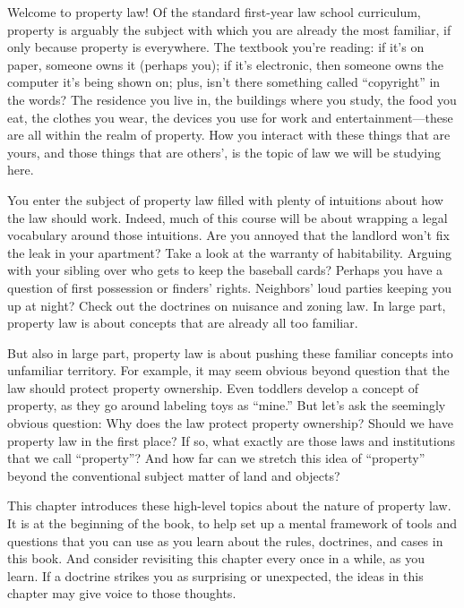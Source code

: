 Welcome to property law! Of the standard first-year law school curriculum,
property is arguably the subject with which you are already the most familiar,
if only because property is everywhere. The textbook you're reading: if it's on
paper, someone owns it (perhaps you); if it's electronic, then someone owns the
computer it's being shown on; plus, isn't there something called ``copyright''
in the words? The residence you live in, the buildings where you study,
the food you eat, the clothes you wear, the devices you use for work and
entertainment---these are all within the realm of property. How you interact
with these things that are yours, and those things that are others', is the
topic of law we will be studying here.

You enter the subject of property law filled with plenty of intuitions about how
the law should work. Indeed, much of this course will be about wrapping a legal
vocabulary around those intuitions. Are you annoyed that the landlord won't fix
the leak in your apartment? Take a look at the warranty of habitability. Arguing
with your sibling over who gets to keep the baseball cards? Perhaps you have a
question of first possession or finders' rights. Neighbors' loud parties keeping
you up at night? Check out the doctrines on nuisance and zoning law. In large
part, property law is about concepts that are already all too familiar.

But also in large part, property law is about pushing these familiar concepts
into unfamiliar territory. For example, it may seem obvious beyond question that
the law should protect property ownership.
Even toddlers develop a concept of property, as they go around
labeling toys as ``mine.'' But let's ask the seemingly obvious question: Why
does the law protect property ownership? Should we have property law in the
first place? If so, what exactly are those laws and institutions that we
call ``property''? And how far can we stretch this idea of ``property'' beyond
the conventional subject matter of land and objects?

This chapter introduces these high-level topics about the nature of property
law. It is at the beginning of the book, to help set up a mental framework of
tools and questions that you can use as you learn about the rules, doctrines,
and cases in this book. And consider revisiting this chapter every once in a
while, as you learn. If a doctrine strikes you as surprising or unexpected,
the ideas in this chapter may give voice to those thoughts.
